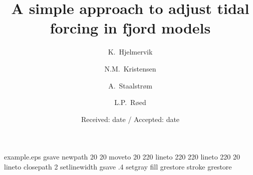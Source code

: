 \begin{filecontents*}{example.eps}
gsave
newpath
  20 20 moveto
  20 220 lineto
  220 220 lineto
  220 20 lineto
closepath
2 setlinewidth
gsave
  .4 setgray fill
grestore
stroke
grestore
\end{filecontents*}

\RequirePackage{fix-cm}
%
\documentclass[smallcondensed]{svjour3}     %
%
\smartqed  %
%
\usepackage{graphicx}
%
%
%
%
\usepackage{hhline}
\usepackage{natbib}
\usepackage{subfigure}
\usepackage{amssymb}
\usepackage[latin1]{inputenc}
\usepackage[usenames]{color}

%


\title{A simple approach to adjust tidal forcing in fjord models
}


\author{K.~Hjelmervik \and N.M.~Kristensen \and A.~Staalstr{\o}m \and L.P.~R{\o}ed
}



\date{Received: date / Accepted: date}


\maketitle













